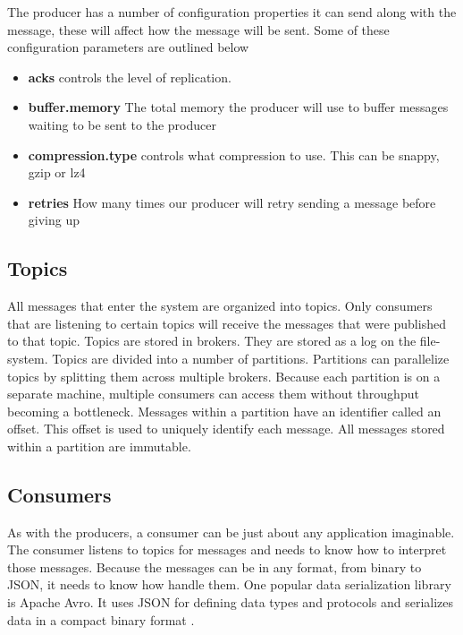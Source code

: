The producer has a number of configuration properties it can send along with the message, these will affect how the message will be sent. Some of these configuration parameters are outlined below

\begin{itemize}
  \item \textbf{acks} controls the level of replication.
  \item \textbf{buffer.memory} The total memory the producer will use to buffer messages waiting to be sent to the producer
  \item \textbf{compression.type} controls what compression to use. This can be snappy, gzip or lz4
  \item \textbf{retries} How many times our producer will retry sending a message before giving up
\end{itemize}

\subsection{Topics}

All messages that enter the system are organized into topics. Only consumers that are listening to certain topics will receive the messages that were published to that topic. Topics are stored in brokers. They are stored as a log on the file-system. Topics are divided into a number of partitions. Partitions can parallelize topics by splitting them across multiple brokers. Because each partition is on a separate machine, multiple consumers can access them without throughput becoming a bottleneck. Messages within a partition have an identifier called an offset. This offset is used to uniquely identify each message. All messages stored within a partition are immutable.

\subsection{Consumers}

As with the producers, a consumer can be just about any application imaginable. The consumer listens to topics for messages and needs to know how to interpret those messages. Because the messages can be in any format, from binary to JSON, it needs to know how handle them. One popular data serialization library is Apache Avro. It uses JSON for defining data types and protocols and serializes data in a compact binary format \cite{wiki:avro}.